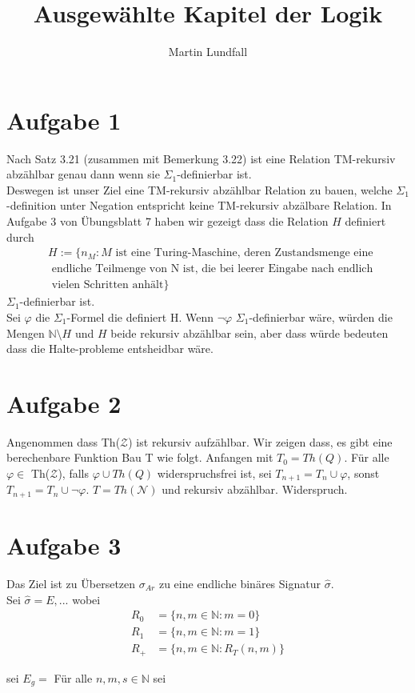 \documentclass[12pt]{article}
\begin{document}
\title{Ausgewählte Kapitel der Logik}
\author{Martin Lundfall}
\maketitle

\section*{Aufgabe 1}
Nach Satz 3.21 (zusammen mit Bemerkung 3.22) ist eine Relation TM-rekursiv abzählbar genau dann wenn sie $\Sigma_1$-definierbar ist.\\
Deswegen ist unser Ziel eine TM-rekursiv abzählbar Relation zu bauen, welche $\Sigma_1$-definition unter Negation entspricht keine TM-rekursiv abzälbare Relation.
In Aufgabe 3 von Übungsblatt 7 haben wir gezeigt dass die Relation $H$ definiert durch
\begin{equation}
  \begin{split}
  &H := \{n_M : M \mbox{ ist eine Turing-Maschine, deren Zustandsmenge eine }\\
  &\mbox{ endliche Teilmenge von N ist, die bei leerer Eingabe nach endlich }\\
  &\mbox{ vielen Schritten anhält}\}
  \end{split}
\end{equation}
$\Sigma_1$-definierbar ist.\\
Sei $\varphi$ die $\Sigma_1$-Formel die definiert H. Wenn $\neg \varphi$ $\Sigma_1$-definierbar wäre, würden die Mengen $\mathbb N \setminus H$ und $H$ beide rekursiv abzählbar sein, aber dass würde bedeuten dass die Halte-probleme entsheidbar wäre.
\section*{Aufgabe 2}
Angenommen dass Th($\mathcal Z$) ist rekursiv aufzählbar. Wir zeigen dass, es gibt eine berechenbare Funktion
Bau T wie folgt.  Anfangen mit $T_0 = Th(Q)$.
Für alle $\varphi \in$ Th($\mathcal Z$), falls $\varphi \cup Th(Q)$ widerspruchsfrei ist, sei $T_{n+1} = T_{n} \cup \varphi$, sonst $T_{n+1} = T_{n} \cup \neg \varphi$.
$T = Th(\mathcal N)$ und rekursiv abzählbar. Widerspruch.
\section*{Aufgabe 3}
Das Ziel ist zu Übersetzen $\sigma_{Ar}$ zu eine endliche binäres Signatur $\hat \sigma$.\\
Sei $\hat \sigma = {E,...}$ wobei\\
\begin{equation}
  \begin{split}
    R_{0} &= \{n, m \in \mathbb N : m = 0\}\\
    R_{1} &= \{n, m \in \mathbb N : m = 1\}\\
    R_{+} &= \{n, m \in \mathbb N : R_{T}(n,m)\}
    \end{split}
\end{equation}

sei $E_g = $
Für alle $n, m, s \in \mathbb N$ sei
\end{document}
